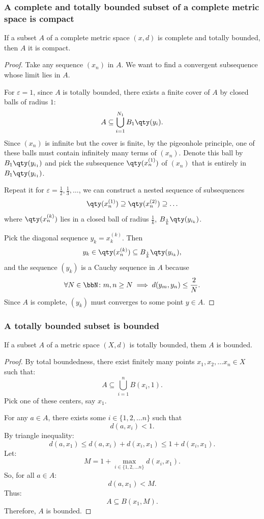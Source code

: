 \documentclass[a4paper,12pt]{article}
\begin{document}
\subsubsection{A complete and totally bounded subset of a complete metric space is compact}
If a subset $A$ of a complete metric space $(x,d)$ is complete and totally bounded, then $A$ it is compact.
\begin{proof}
Take any sequence $(x_n)$ in $A$. We want to find a convergent subsequence whose limit lies in $A$.

For $\varepsilon=1$, since $A$ is totally bounded, there exists a finite cover of $A$ by closed balls of radius $1$:
    \[A\subseteq\bigcup_{i=1}^{N_1}B_1\qty(y_i).\]
    Since $(x_n)$ is infinite but the cover is finite, by the pigeonhole principle, one of these balls must contain infinitely many terms of $(x_n)$. Denote this ball by $B_1\qty(y_{i_1})$ and pick the subsequence $\qty(x_n^{(1)})$ of $(x_n)$ that is entirely in $B_1\qty(y_{i_1})$.

    Repeat it for $\varepsilon=\frac{1}{2},\frac{1}{3},\ldots$, we can construct a nested sequence of subsequences
    \[\qty(x_n^{(1)})\supseteq \qty(x_n^{(2)})\supseteq\ldots\]
    where $\qty(x_n^{(k)})$ lies in a closed ball of radius $\frac{1}{k}$, $B_{\frac{1}{k}}\qty(y_{i_k})$.

    Pick the diagonal sequence $y_k=x_k^{(k)}$. Then
    \[y_k\in\qty(x_n^{(k)})\subseteq B_{\frac{1}{k}}\qty(y_{i_k}),\]
    and the sequence $(y_k)$ is a Cauchy sequence in $A$ because
    \[\forall N\in\bbN\colon m,n\geq N\implies d(y_m,y_n)\leq\frac{2}{N}.\]
    Since $A$ is complete, $(y_k)$ must converges to some point $y\in A$.
\end{proof}
\subsubsection{A totally bounded subset is bounded}
If a subset $A$ of a metric space $(X,d)$ is totally bounded, them $A$ is bounded.
\begin{proof}
By total boundedness, there exist finitely many points $x_1,x_2,\ldots x_n\in X$ such that:
\[A\subseteq\bigcup_{i=1}^nB(x_i,1).\]
Pick one of these centers, say $x_1$.

For any $a\in A$, there exists some $i\in\{1,2,\ldots n\}$ such that
\[d(a,x_i)<1.\]
By triangle inequality:
\[d(a,x_1)\leq d(a,x_i)+d(x_i,x_1)\leq 1+d(x_i,x_1).\]
Let:
\[M=1+\max_{i\in\{1,2,\ldots n\}}d(x_i,x_1).\]
So, for all $a\in A$:
\[d(a,x_1)<M.\]
Thus:
\[A\subseteq B(x_1,M).\]
Therefore, $A$ is bounded.
\end{proof}
\end{document}
